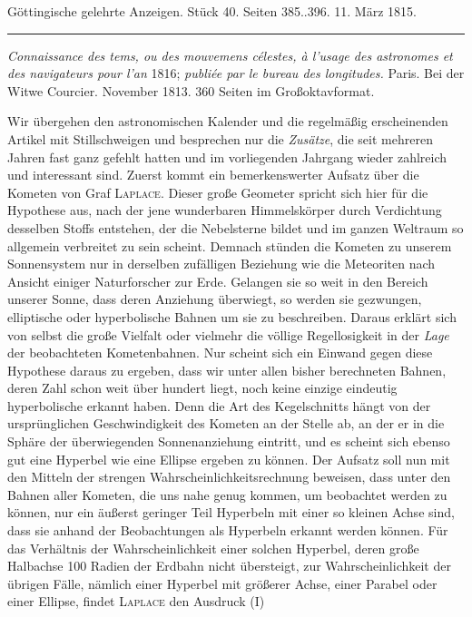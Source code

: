 \clearpage
{}

\hypertarget{native-586-lower}{}
\begin{center}\small Göttingische gelehrte Anzeigen. Stück 40. Seiten 385..396. 11. März 1815.\\[3pt]\rule{.72\linewidth}{.3pt}\end{center}

\emph{Connaissance des tems, ou des mouvemens célestes, à l'usage des astronomes et des navigateurs pour
l'an} 1816; \emph{ publiée par le bureau des longitudes.} Paris. Bei der Witwe Courcier. November 1813. 360 Seiten im Großoktavformat.

Wir übergehen den astronomischen Kalender und die regelmäßig erscheinenden Artikel mit Stillschweigen und besprechen nur die \emph{Zusätze}, die seit mehreren Jahren fast ganz gefehlt hatten und im vorliegenden Jahrgang wieder zahlreich und interessant sind. Zuerst kommt ein bemerkenswerter Aufsatz über die Kometen von Graf \textsc{Laplace}. Dieser große Geometer spricht sich hier für die Hypothese aus, nach der jene wunderbaren Himmelskörper durch Verdichtung desselben Stoffs entstehen, der die Nebelsterne bildet und im ganzen Weltraum so allgemein verbreitet zu sein scheint. Demnach stünden die Kometen zu unserem Sonnensystem nur in derselben zufälligen Beziehung wie die Meteoriten nach Ansicht einiger Naturforscher zur Erde. Gelangen sie so weit in den Bereich unserer Sonne, dass deren Anziehung überwiegt, so werden sie gezwungen, elliptische oder hyperbolische Bahnen um sie zu beschreiben. Daraus erklärt sich von selbst die große Vielfalt oder vielmehr die völlige Regellosigkeit in der \emph{Lage} der beobachteten Kometenbahnen. Nur scheint sich ein Einwand gegen diese Hypothese daraus zu ergeben, dass wir unter allen bisher berechneten Bahnen, deren Zahl schon weit über hundert liegt, noch keine einzige eindeutig hyperbolische erkannt haben. Denn die Art des Kegelschnitts hängt von der ursprünglichen Geschwindigkeit des Kometen an der Stelle ab, an der er in die Sphäre der überwiegenden Sonnenanziehung eintritt, und es scheint sich ebenso gut eine Hyperbel wie eine Ellipse ergeben zu können. Der Aufsatz soll nun mit den Mitteln der strengen Wahrscheinlichkeitsrechnung beweisen, dass unter den Bahnen aller Kometen, die uns nahe genug kommen, um beobachtet werden zu können, nur ein äußerst geringer Teil Hyperbeln mit einer so kleinen Achse sind, dass sie anhand der Beobachtungen als Hyperbeln erkannt werden können. Für das Verhältnis der Wahrscheinlichkeit einer solchen Hyperbel, deren große Halbachse 100 Radien der Erdbahn nicht übersteigt, zur Wahrscheinlichkeit der übrigen Fälle, nämlich einer Hyperbel mit größerer Achse, einer Parabel oder einer Ellipse, findet \textsc{Laplace} den Ausdruck (I)
